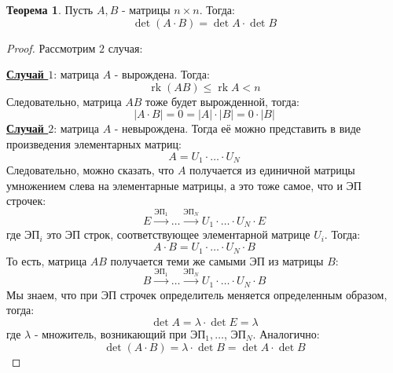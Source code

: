 \documentclass[12pt]{article}
\theoremstyle{definition}
\newtheorem{theorem}{Теорема}
\DeclareMathOperator{\rk}{\text{rk}}
\begin{document}
\begin{theorem}
	Пусть $A, B$ - матрицы $n \times n$. Тогда:
	$$
		\det{(A{\cdot}B)} = \det{A}{\cdot}\det{B}
	$$
\end{theorem}
\begin{proof}
	Рассмотрим $2$ случая:
	
	\textbf{\uline{Случай $1$}}: матрица $A$ - вырождена. Тогда:
	$$
		\rk{(AB)} \leq \rk{A} < n 
	$$
	Следовательно, матрица $AB$ тоже будет вырожденной, тогда:
	$$
		|A{\cdot}B| = 0 = |A|{\cdot}|B| = 0{\cdot}|B|
	$$
	\textbf{\uline{Случай $2$}}: матрица $A$ - невырождена. Тогда её можно представить в виде произведения элементарных матриц:
	$$
		A = U_1{\cdot}\dotsc{\cdot}U_N
	$$
	Следовательно, можно сказать, что $A$ получается из единичной матрицы умножением слева на элементарные матрицы, а это тоже самое, что и ЭП строчек:
	$$
		E \xrightarrow{\text{ЭП}_1} \dotsc \xrightarrow{\text{ЭП}_N} U_1{\cdot}\dotsc{\cdot}U_N{\cdot}E
	$$
	где ЭП$_i$ это ЭП строк, соответствующее элементарной матрице $U_i$. Тогда:
	$$
		A{\cdot}B = U_1{\cdot}\dotsc{\cdot}U_N{\cdot}B
	$$
	То есть, матрица $AB$ получается теми же самыми ЭП из матрицы $B$:
	$$
		B \xrightarrow{\text{ЭП}_1} \dotsc \xrightarrow{\text{ЭП}_N} U_1{\cdot}\dotsc{\cdot}U_N{\cdot}B
	$$
	Мы знаем, что при ЭП строчек определитель меняется определенным образом, тогда:
	$$
		\det{A} = \lambda{\cdot}\det{E} = \lambda
	$$
	где $\lambda$ - множитель, возникающий при ЭП$_1, \dotsc$, ЭП$_N$. Аналогично:
	$$
		\det{(A{\cdot}B)} = \lambda{\cdot}\det{B} = \det{A}{\cdot}\det{B}
	$$
\end{proof}

\newpage
\end{document}
